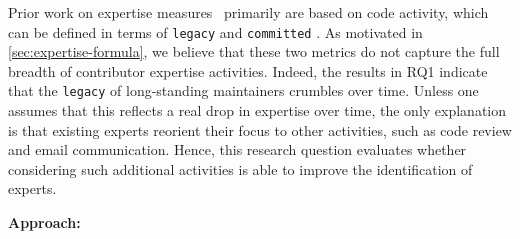 Prior work on expertise measures~\cite{Anvik-2006, Bhattacharya, McDonald, Minto-2007, mockus02} primarily are based on code activity, which can be defined in terms of \texttt{legacy} and \texttt{committed}%
. As motivated in \autoref{sec:expertise-formula}, we believe that these two metrics do not capture the full breadth of contributor expertise activities. Indeed, the results in RQ1 indicate that the \texttt{legacy} of long-standing maintainers crumbles over time. Unless one assumes that this reflects a real drop in expertise over time, the only explanation is that existing experts reorient their focus to other activities, such as code review and email communication. Hence, this research question evaluates whether considering such additional activities is able to improve the identification of experts.%

{\bf Approach:}





